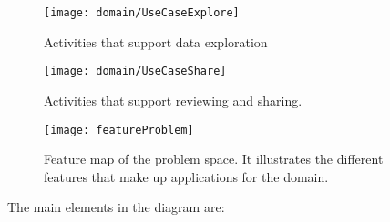 \begin{figure}
\centering
\texttt{[image: domain/UseCaseExplore]}
\caption{Activities that support data exploration\label{fig_use_case_explore}}
\end{figure}

\begin{figure}
\centering
\texttt{[image: domain/UseCaseShare]}
\caption{Activities that support reviewing and sharing.\label{fig_use_case_share}}
\end{figure}

\begin{figure}
\centering
\texttt{[image: featureProblem]}
\caption{\label{fig_feature_problem}Feature map of the problem space. It illustrates the different features that make up applications for the domain.}
\end{figure}

The main elements in the diagram are:

